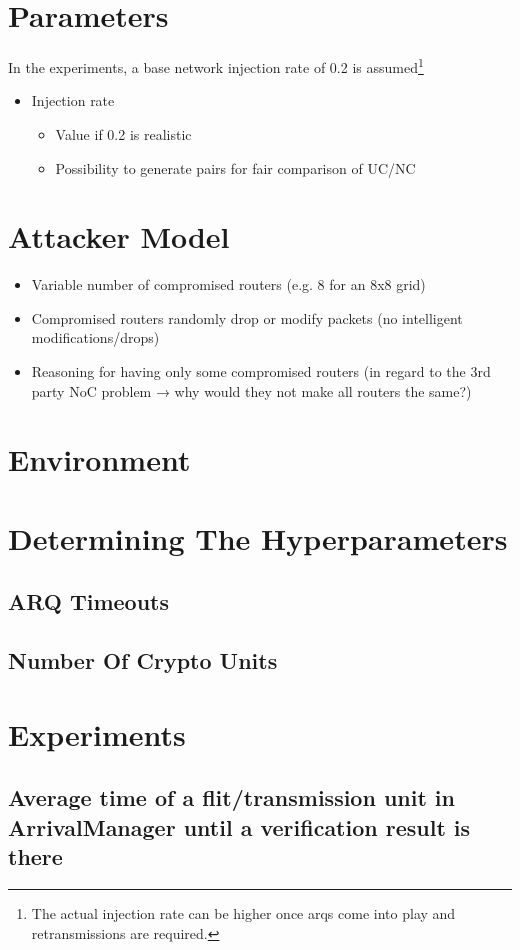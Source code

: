 \section{Parameters}
In the experiments, a base network injection rate of 0.2 is assumed\footnote{The actual injection rate can be higher once \glspl{arq} come into play
and retransmissions are required.}
\begin{itemize}
    \item Injection rate
        \begin{itemize}
            \item Value if 0.2 is realistic
            \item Possibility to generate pairs for fair comparison of UC/NC
        \end{itemize}
\end{itemize}

\section{Attacker Model}
\begin{itemize}
    \item Variable number of compromised routers (e.g. 8 for an 8x8 grid)
    \item Compromised routers randomly drop or modify packets (no intelligent modifications/drops)
    \item Reasoning for having only some compromised routers (in regard to the 3rd party NoC problem → why would they not make all routers the same?)
\end{itemize}

\section{Environment}

\section{Determining The Hyperparameters}
\subsection{ARQ Timeouts}
\subsection{Number Of Crypto Units}

\section{Experiments}
\subsection{Average time of a flit/transmission unit in ArrivalManager until a verification result is there}
